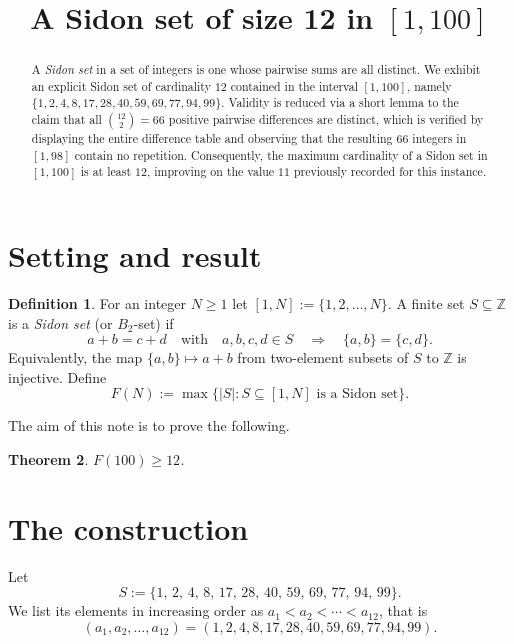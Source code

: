 \documentclass[a4paper,11pt]{amsart}
\title{A Sidon set of size 12 in $[1,100]$}
\theoremstyle{plain}
\newtheorem{theorem}{Theorem}
\theoremstyle{definition}
\newtheorem{definition}[theorem]{Definition}
\begin{document}
\maketitle

\begin{abstract}
A \emph{Sidon set} in a set of integers is one whose pairwise sums are all
distinct. We exhibit an explicit Sidon set of cardinality $12$ contained in
the interval $[1,100]$, namely
$\{1,2,4,8,17,28,40,59,69,77,94,99\}$. Validity is reduced via a short
lemma to the claim that all $\binom{12}{2}=66$ positive pairwise
differences are distinct, which is verified by displaying the entire
difference table and observing that the resulting $66$ integers in
$[1,98]$ contain no repetition. Consequently, the maximum cardinality of
a Sidon set in $[1,100]$ is at least $12$, improving on the value $11$
previously recorded for this instance.
\end{abstract}

\section{Setting and result}

\begin{definition}
For an integer $N\geq 1$ let $[1,N]:=\{1,2,\dots,N\}$. A finite set
$S\subseteq\mathbb{Z}$ is a \emph{Sidon set} (or $B_2$\nobreakdash-set) if
\[
a+b=c+d\quad\text{with}\quad a,b,c,d\in S\quad\Longrightarrow\quad
\{a,b\}=\{c,d\}.
\]
Equivalently, the map $\{a,b\}\mapsto a+b$ from two\nobreakdash-element
subsets of $S$ to $\mathbb{Z}$ is injective. Define
\[
F(N):=\max\{|S| : S\subseteq[1,N]\text{ is a Sidon set}\}.
\]
\end{definition}

The aim of this note is to prove the following.

\begin{theorem}\label{thm:main}
$F(100)\geq 12$.
\end{theorem}

\section{The construction}

Let
\begin{equation}\label{eq:S}
S:=\{1,\,2,\,4,\,8,\,17,\,28,\,40,\,59,\,69,\,77,\,94,\,99\}.
\end{equation}
We list its elements in increasing order as $a_1<a_2<\cdots<a_{12}$, that
is
\[
(a_1,a_2,\dots,a_{12})=(1,2,4,8,17,28,40,59,69,77,94,99).
\]
\end{document}
